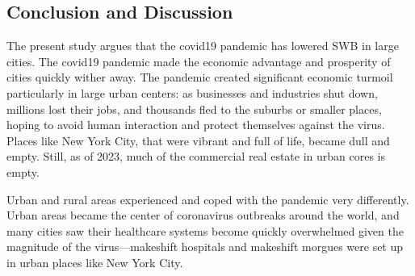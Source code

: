 \documentclass[10pt, letterpaper]{article}
\begin{document}
\begin{spacing}{1.4}
\section{Conclusion and Discussion}

The present study argues that the covid19 pandemic has lowered SWB in
large cities. %
%
%
%
%
The covid19 pandemic made the economic advantage and prosperity of
cities quickly wither away. The pandemic created significant economic turmoil
particularly in large urban centers: as businesses and industries shut down,
millions lost their jobs, and thousands fled to the suburbs or smaller places,
hoping to avoid human interaction and protect themselves against the
virus. Places like New York City, that were vibrant and full of life, became
dull and empty. Still, as of 2023, much of the commercial real estate in urban cores
is empty.

Urban and rural areas experienced and coped with the pandemic very
differently. Urban areas became the center of coronavirus outbreaks around the
world, and many cities saw their healthcare systems become quickly overwhelmed
given the magnitude of the virus---makeshift hospitals and makeshift morgues were
set up in urban places like New York City.


\end{spacing}
\end{document}
